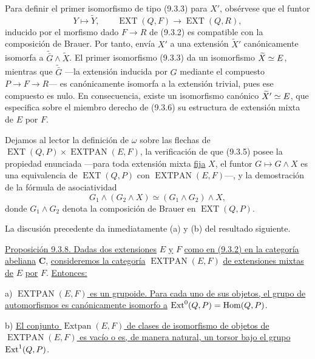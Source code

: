 Para definir el primer isomorfismo de tipo (9.3.3) para $X'$, obsérvese
que el funtor
\begin{equation*}
 Y\longmapsto\widetilde Y,
 \qquad
 \operatorname{EXT}(Q,F)\longrightarrow\operatorname{EXT}(Q,R),
\end{equation*}
inducido por el morfismo dado $F\longrightarrow R$ de (9.3.2) es
compatible con la composición de Brauer. Por tanto, envía $X'$ a una
extensión $\widetilde X'$ canónicamente isomorfa a
$\widetilde{\bar G}\wedge\widetilde X$. El primer isomorfismo (9.3.3)
da un isomorfismo
$\widetilde X\simeq\sisi{F}{E}$, mientras que
$\widetilde{\bar G}$ —la extensión inducida por $G$ mediante el
compuesto $P\longrightarrow F\longrightarrow R$— es canónicamente
isomorfa a la extensión trivial, pues ese compuesto es nulo. En
consecuencia, existe un isomorfismo canónico
$\widetilde X'\simeq\sisi{F}{E}$, que especifica sobre el miembro
derecho de (9.3.6) su estructura de extensión mixta de $E$ por $F$.


Dejamos al lector la definición de $\omega$ sobre las flechas de
$\operatorname{EXT}(Q,P)\times\operatorname{EXTPAN}(E,F)$, la
verificación de que (9.3.5) posee la propiedad enunciada —para toda
extensión mixta \underline{fija} $X$, el funtor
$G\longmapsto G\wedge X$ es una equivalencia de
$\operatorname{EXT}(Q,P)$ con $\operatorname{EXTPAN}(E,F)$—, y la
demostración de la fórmula de asociatividad
\begin{equation}\tag{9.3.7}
 G_1\wedge(G_2\wedge X)
 \simeq(G_1\wedge G_2)\wedge X,
\end{equation}
donde $G_1\wedge G_2$ denota la composición de Brauer en
$\operatorname{EXT}(Q,P)$.

La discusión precedente da inmediatamente (a) y (b) del resultado
siguiente.

\medskip
\noindent
\underline{Proposición 9.3.8. Dadas dos extensiones} $E$ \underline{y} $F$ \underline{como en
(9.3.2) en la categoría abeliana} $\mathbf C$, \underline{consideremos la
categoría} $\operatorname{EXTPAN}(E,F)$ \underline{de extensiones mixtas de} $E$ \underline{por}
$F$. \underline{Entonces:}

\smallskip
\noindent
a) \underline{$\operatorname{EXTPAN}(E,F)$ es un grupoide. Para cada
uno de sus objetos, el grupo de automorfismos es canónicamente
isomorfo a}
$\Ext^0(Q,P)=\Hom(Q,P)$.

\smallskip
\noindent
b) \underline{El conjunto $\operatorname{Extpan}(E,F)$ de clases de
isomorfismo de objetos de $\operatorname{EXTPAN}(E,F)$ es vacío o es,
de manera natural, un torsor bajo el grupo} $\Ext^1(Q,P)$.

